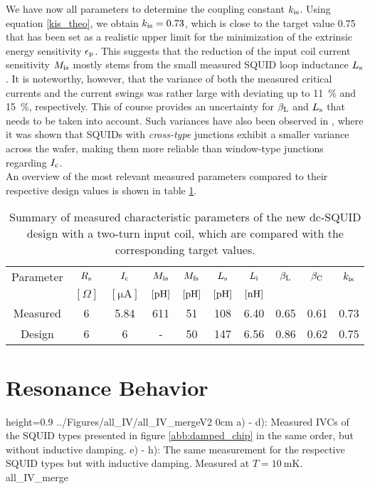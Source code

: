 We have now all parameters to determine the coupling constant $k_{\rm is}$. Using equation \ref{kis_theo}, we obtain $k_{\rm is}=0.73$, which is close to the target value 0.75 that has been set as a realistic upper limit for the minimization of the extrinsic energy sensitivity $\epsilon_{\rm p}$. This suggests that the reduction of the input coil current sensitivity $M_{\rm is}$ mostly stems from the small measured SQUID loop inductance $L_{\rm s}$. It is noteworthy, however, that the variance of both the measured critical currents and the current swings was rather large with deviating up to \qty{11}{\percent} and \qty{15}{\percent}, respectively. This of course provides an uncertainty for $\beta_{\rm L}$ and $L_{\rm s}$ that needs to be taken into account. Such variances have also been observed in \cite{Bauer2022}, where it was shown that SQUIDs with \textit{cross-type} junctions exhibit a smaller variance across the wafer, making them more reliable than window-type junctions regarding $I_{\rm c}$. \\    
An overview of the most relevant measured parameters compared to their respective design values is shown in table \ref{tab:SQUIDparameters}.

\begin{table}[htb]
	\centering
	\begin{tabular}{c|*{9}{c}}
	\toprule
		Parameter & $R_{\rm s}$ & $I_{\rm c}$ & $M_{\rm is}$ & $M_{\rm fs}$ & $L_{\rm s}$ & $L_{\rm i}$ & $\beta_{\rm L}$ & $\beta_{\rm C}$ & $k_{\rm is}$ \\
		 & $[\Omega]$ & $[\unit{\micro\ampere}]$ & $[\unit{\pH}]$ & $[\unit{\pH}]$ & $[\unit{\pH}]$ & $[\unit{\nH}]$ &  &  &  \\
		\midrule
		Measured & 6 & 5.84 & 611 & 51 & 108 & 6.40 & 0.65 & 0.61 & 0.73 \\
		Design & 6 & 6 & - & 50 & 147 & 6.56 & 0.86 & 0.62 & 0.75 \\
	\end{tabular}
	\caption{Summary of measured characteristic parameters of the new dc-SQUID design with a two-turn input coil, which are compared with the corresponding target values.}
	\label{tab:SQUIDparameters}
\end{table}

\section{Resonance Behavior}\label{sec_resonance_results}


{height=0.9\textheight}
{../Figures/all_IV/all_IV_mergeV2}
{0cm}
{a) - d): Measured IVCs of the SQUID types presented in figure \ref{abb:damped_chip} in the same order, but without inductive damping. e) - h): The same measurement for the respective SQUID types but with inductive damping. Measured at $T=\qty{10}{\milli\kelvin}$.} 
{all_IV_merge}

